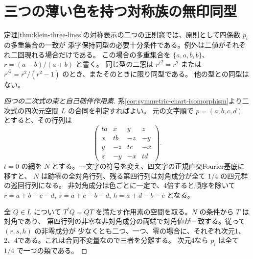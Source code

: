 \section{三つの薄い色を持つ対称族の無印同型}
\label{sec:three-lines-symmetric-isomorphism}
\begin{theorem}\label{thm:three-lines-symmetric-isomorphism}
定理\ref{thm:klein-three-lines}の対称表示の二つの正則窓では、原則として四係数 $p_i$ の多重集合の一致が
添字保持同型の必要十分条件である。例外は二値がそれぞれ二回現れる場合だけである。
この場合の多重集合を $\{a,a,b,b\}$、$r=(a-b)/(a+b)$ と書く。
同じ型の二窓は $r'^2=r^2$ または $r'^2=r^2/(r^2-1)$ のとき、またそのときに限り同型である。
他の型との同型はない。
\end{theorem}
\begin{proof}[四つの二次式の束と自己随伴作用素]
系\ref{cor:symmetric-chart-isomorphism}より二次式の四次元空間 $L$ の合同を判定すればよい。
元の文字順で $p=(a,b,c,d)$ とすると、その行列は
\[
 \begin{pmatrix}
 ta&x&y&z\\ x&tb&-z&-y\\ y&-z&tc&-x\\ z&-y&-x&td
 \end{pmatrix}.
\]
$t=0$ の網を $N$ とする。一文字の符号を変え、四文字の正規直交Fourier基底に移すと、
$N$ は跡零の全対角行列、残る第四行列は対角成分が全て $1/4$ の四元群の巡回行列になる。
非対角成分は色ごとに一定で、4倍すると順序を除いて
$r=a+b-c-d$, $s=a+c-b-d$, $h=a+d-b-c$ となる。

全 $Q\in L$ について $T^tQ=QT$ を満たす作用素の空間を取る。$N$ の条件から $T$ は対角であり、
第四行列の非零な非対角成分の両端で対角値が一致する。従って $(r,s,h)$ の非零成分が
少なくとも二つ、一つ、零の場合に、それぞれ次元1、2、4である。これは合同不変量なので三者を分離する。
次元4なら $p_i$ は全て $1/4$ で一つの類である。
\end{proof}

